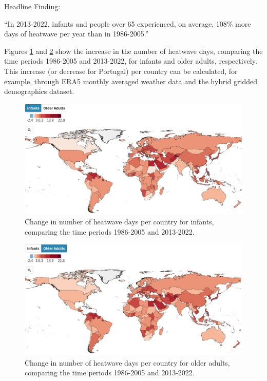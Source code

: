 \documentclass[
]{krantz}
\begin{document}
Headline Finding:

``In 2013-2022, infants and people over 65 experienced, on average, 108\% more days of heatwave per year than in 1986-2005.''

Figures \ref{fig:heatwaves1infantsstrobl} and \ref{fig:heatwaves1adultsstrobl} show the increase in the number of heatwave days, comparing the time periods 1986-2005 and 2013-2022, for infants and older adults, respectively. This increase (or decrease for Portugal) per country can be calculated, for example, through ERA5 monthly averaged weather data and the hybrid gridded demographics dataset.

\begin{figure}

{\centering \includegraphics[width=0.8\linewidth]{work/08-lancet/figures/indicator_1_1} 

}

\caption{Change in number of heatwave days per country for infants, comparing the time periods 1986-2005 and 2013-2022.}\label{fig:heatwaves1infantsstrobl}
\end{figure}
\begin{figure}

{\centering \includegraphics[width=0.8\linewidth]{work/08-lancet/figures/indicator_1_2} 

}

\caption{Change in number of heatwave days per country for older adults, comparing the time periods 1986-2005 and 2013-2022.}\label{fig:heatwaves1adultsstrobl}
\end{figure}
\end{document}

